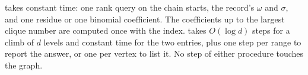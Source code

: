 \Value takes constant time: one rank query on the chain starts, the record's $\omega$ and $\sigma$, and one residue or one binomial coefficient.
%
The coefficients up to the largest clique number are computed once with the index.
%
\Community takes $O(\log d)$ steps for a climb of $d$ levels and constant time for the two entries, plus one step per range to report the answer, or one per vertex to list it.
%
No step of either procedure touches the graph.

